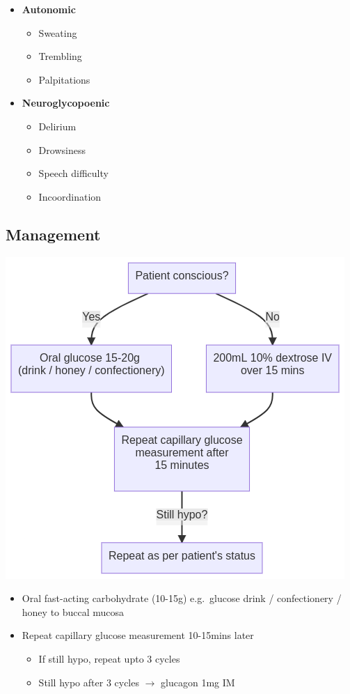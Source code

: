\documentclass[
  12pt,
]{memoir}
\providecommand{\tightlist}{%
  \setlength{\itemsep}{0pt}\setlength{\parskip}{0pt}}
\begin{document}
\begin{itemize}
\tightlist
\item
  \textbf{Autonomic}

  \begin{itemize}
  \tightlist
  \item
    Sweating
  \item
    Trembling
  \item
    Palpitations
  \end{itemize}
\item
  \textbf{Neuroglycopoenic}

  \begin{itemize}
  \tightlist
  \item
    Delirium
  \item
    Drowsiness
  \item
    Speech difficulty
  \item
    Incoordination
  \end{itemize}
\end{itemize}

\hypertarget{management-4}{%
\subsection{Management}\label{management-4}}

\includegraphics[width=.7\textwidth]{../assets/hypogly.png}

\begin{itemize}
\tightlist
\item
  Oral fast-acting carbohydrate (10-15g) e.g.~glucose drink /
  confectionery / honey to buccal mucosa
\item
  Repeat capillary glucose measurement 10-15mins later

  \begin{itemize}
  \tightlist
  \item
    If still hypo, repeat upto 3 cycles
  \item
    Still hypo after 3 cycles \(\rightarrow\) glucagon 1mg IM
  \end{itemize}
\end{itemize}

\backmatter
\end{document}
